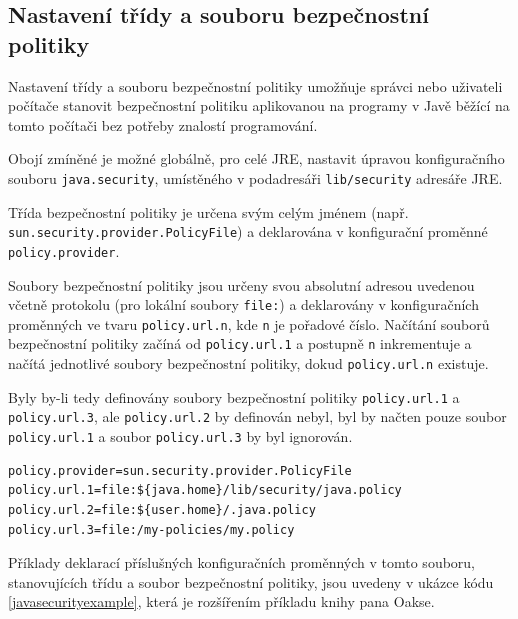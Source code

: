 \subsection{Nastavení třídy a souboru bezpečnostní politiky} \label{souborPolitiky}

Nastavení třídy a souboru bezpečnostní politiky umožňuje správci nebo uživateli počítače stanovit bezpečnostní politiku aplikovanou na programy v Javě běžící na tomto počítači bez potřeby znalostí programování.

Obojí zmíněné je možné globálně, pro celé JRE, nastavit úpravou konfiguračního souboru {\tt java.security}, umístěného v podadresáři {\tt lib/security} adresáře JRE. \cite{refPolicyFiles}

Třída bezpečnostní politiky je určena svým celým jménem (např. {\tt sun.security.provider.PolicyFile}) a deklarována v konfigurační proměnné {\tt policy.provider}. \cite{refPolicyFiles}

Soubory bezpečnostní politiky jsou určeny svou absolutní adresou uvedenou včetně protokolu (pro lokální soubory {\tt file:}) a deklarovány v konfiguračních proměnných ve tvaru {\tt policy.url.n}, kde {\tt n} je pořadové číslo. Načítání souborů bezpečnostní politiky začíná od {\tt policy.url.1} a postupně {\tt n} inkrementuje a načítá jednotlivé soubory bezpečnostní politiky, dokud {\tt policy.url.n} existuje. \cite{refPolicyFiles}

Byly by-li tedy definovány soubory bezpečnostní politiky {\tt policy.url.1} a {\tt policy.url.3}, ale {\tt policy.url.2} by definován nebyl, byl by načten pouze soubor {\tt policy.url.1} a soubor {\tt policy.url.3} by byl ignorován. \cite{refPolicyFiles}

\begin{lstlisting}[caption=Význačnější proměnné konfiguračního souboru {\tt java.security}, label=javasecurityexample]
policy.provider=sun.security.provider.PolicyFile
policy.url.1=file:${java.home}/lib/security/java.policy
policy.url.2=file:${user.home}/.java.policy
policy.url.3=file:/my-policies/my.policy
\end{lstlisting}

Příklady deklarací příslušných konfiguračních proměnných v tomto souboru, stanovujících třídu a soubor bezpečnostní politiky, jsou uvedeny v ukázce kódu \ref{javasecurityexample}, která je rozšířením příkladu knihy pana Oakse. \cite[5.3.1]{oaks}


